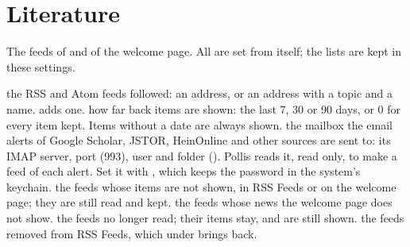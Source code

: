 \section{Literature}\label{sec:literature}
The feeds of  and of the welcome page. All are set from  itself; the
lists are kept in these settings.
\begin{itemize}
    the RSS and Atom feeds followed: an address, or an address with a topic and a name.  adds one.
    how far back items are shown: the last 7, 30 or 90 days, or 0 for every item kept. Items without a date are
    always shown.
    the mailbox the email alerts of Google Scholar, JSTOR, HeinOnline and other sources are sent to: its IMAP server,
    port (993), user and folder (). Pollis reads it, read only, to make a feed of each alert. Set it with
    , which keeps the password in the system's keychain.
    the feeds whose items are not shown, in RSS Feeds or on the welcome page; they are still read and kept.
    the feeds whose news the welcome page does not show.
    the feeds no longer read; their items stay, and are still shown.
    the feeds removed from RSS Feeds, which  under  brings back.
\end{itemize}

